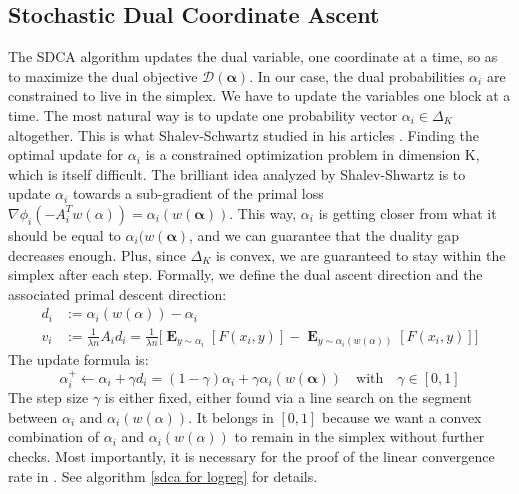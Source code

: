 \documentclass{article}
\DeclareMathOperator{\1}{\mathbb{1}}
\DeclareMathOperator{\E}{\mathbf{E}}
\begin{document}
\subsection{Stochastic Dual Coordinate Ascent}
The SDCA algorithm updates the dual variable, one coordinate at a time, so as to maximize the dual objective $\mathscr D(\bm \alpha)$.
In our case, the dual probabilities $\alpha_i$ are constrained to live in the simplex.
We have to update the variables one block at a time.
The most natural way is to update one probability vector $\alpha_i \in \Delta_K$ altogether.
This is what Shalev-Schwartz studied in his articles \cite{shalev-shwartz_accelerated_2013-1}.
Finding the optimal update for $\alpha_i$ is a constrained optimization problem in dimension K, which is itself difficult. 
The brilliant idea analyzed by Shalev-Shwartz is to update $\alpha_i$ towards a sub-gradient of the primal loss $\nabla\phi_i( - A_i^Tw(\alpha)) = \alpha_i(w(\bm \alpha))$.
This way, $\alpha_i$ is getting closer from what it should be equal to $\alpha_i(w(\bm \alpha)$, and we can guarantee that the duality gap decreases enough.
Plus, since $\Delta_K$ is convex, we are guaranteed to stay within the simplex after each step.  
Formally, we define the dual ascent direction and the associated primal descent direction:
\begin{align*}
	d_i &:= \alpha_i(w(\alpha)) - \alpha_i \\
	v_i &:= \frac{1}{\lambda n} A_i d_i  = \frac{1}{\lambda n} \big [ \E_{y \sim \alpha_i} [F(x_i, y)] - \E_{y \sim  \alpha_i(w(\alpha))} [F(x_i, y)] \big ]
\end{align*} 
The update formula is:
\begin{equation*}
	\alpha_i^+ \leftarrow \alpha_i + \gamma d_i = (1-\gamma)\alpha_i + \gamma \alpha_i(w(\bm \alpha)) \quad \textrm{with} \quad \gamma \in [0,1]
\end{equation*}
The step size $\gamma$ is either fixed, either found via a line search on the segment between $\alpha_i$ and $\alpha_i(w(\alpha))$. 
It belongs in $[0,1]$ because we want a convex combination of $\alpha_i$ and $\alpha_i(w(\alpha))$ to remain in the simplex without further checks. 
Most importantly, it is necessary for the proof of the linear convergence rate in \cite{shalev-shwartz_accelerated_2013-1}. 
See algorithm \ref{sdca for logreg} for details.
\end{document}
